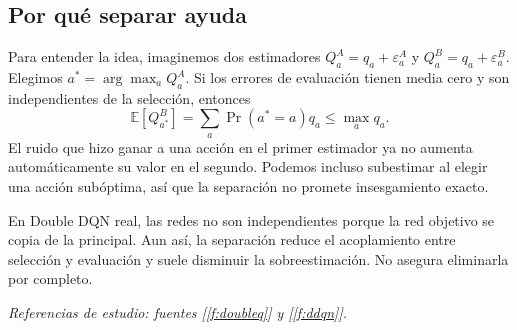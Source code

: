 \documentclass[11pt,a4paper]{article}
\newcommand{\E}{\mathbb{E}}
\newcommand{\apartado}[1]{\subsection*{#1}}
\begin{document}
\apartado{Por qué separar ayuda}
Para entender la idea, imaginemos dos estimadores $Q^A_a=q_a+\varepsilon^A_a$ y $Q^B_a=q_a+\varepsilon^B_a$. Elegimos $a^*=\arg\max_aQ^A_a$. Si los errores de evaluación tienen media cero y son independientes de la selección, entonces
\[
\E[Q^B_{a^*}]=\sum_a\Pr(a^*=a)q_a\leq\max_a q_a.
\]
El ruido que hizo ganar a una acción en el primer estimador ya no aumenta automáticamente su valor en el segundo. Podemos incluso subestimar al elegir una acción subóptima, así que la separación no promete insesgamiento exacto.

En Double DQN real, las redes no son independientes porque la red objetivo se copia de la principal. Aun así, la separación reduce el acoplamiento entre selección y evaluación y suele disminuir la sobreestimación. No asegura eliminarla por completo.

\textit{Referencias de estudio: fuentes [\ref{f:doubleq}] y [\ref{f:ddqn}].}
\end{document}
